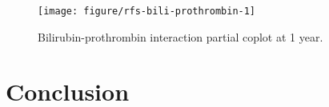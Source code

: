 \documentclass[nojss]{jss}\usepackage[]{graphicx}\usepackage[]{color}
\begin{document}
\begin{Schunk}
\begin{figure}[!htpb]

{\centering \texttt{[image: figure/rfs-bili-prothrombin-1]} 

}

\caption[Bilirubin-prothrombin interaction partial coplot at 1 year]{Bilirubin-prothrombin interaction partial coplot at 1 year.\label{fig:bili-prothrombin}}
\end{figure}
\end{Schunk}
\section{Conclusion}



\end{document}
